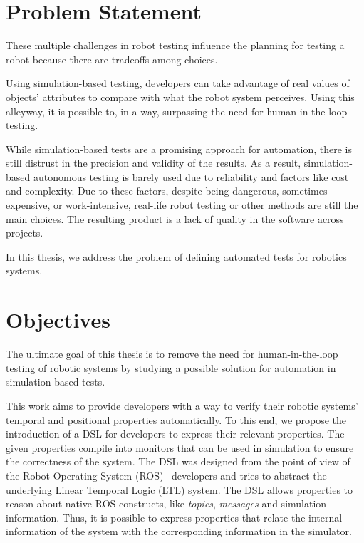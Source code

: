 \section{Problem Statement}
\label{sec:problem}

These multiple challenges in robot testing influence the planning for testing a robot because there are tradeoffs among choices.

Using simulation-based testing, developers can take advantage of real values of objects' attributes to compare with what the robot system perceives. Using this alleyway, it is possible to, in a way, surpassing the need for human-in-the-loop testing. 
 
While simulation-based tests are a promising approach for automation, there is still distrust in the precision and validity of the results. As a result, simulation-based autonomous testing is barely used due to reliability and factors like cost and complexity. Due to these factors, despite being dangerous, sometimes expensive, or work-intensive, real-life robot testing or other methods are still the main choices. The resulting product is a lack of quality in the software across projects.

In this thesis, we address the problem of defining automated tests for robotics systems.


\section{Objectives}
\label{sec:objectives}

The ultimate goal of this thesis is to remove the need for human-in-the-loop testing of robotic systems by studying a possible solution for automation in simulation-based tests.

This work aims to provide developers with a way to verify their robotic systems' temporal and positional properties automatically. To this end, we propose the introduction of a DSL for developers to express their relevant properties. The given properties compile into monitors that can be used in simulation to ensure the correctness of the system. The DSL was designed from the point of view of the Robot Operating System (ROS)~\cite{quigley2009ros} developers and tries to abstract the underlying Linear Temporal Logic (LTL) system. The DSL allows properties to reason about native ROS constructs, like \textit{topics}, \textit{messages} and simulation information. Thus, it is possible to express properties that relate the internal information of the system with the corresponding information in the simulator.

